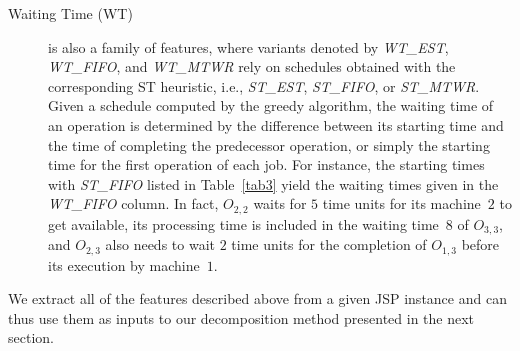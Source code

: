 \documentclass[runningheads]{llncs}
\newcommand{\stest}{\textit{ST\_EST}\xspace}
\newcommand{\stmtwr}{\textit{ST\_MTWR}\xspace}
\newcommand{\stfifo}{\textit{ST\_FIFO}\xspace}
\newcommand{\wtest}{\textit{WT\_EST}\xspace}
\newcommand{\wtmtwr}{\textit{WT\_MTWR}\xspace}
\newcommand{\wtfifo}{\textit{WT\_FIFO}\xspace}
\begin{document}
\begin{description}
  \item[Waiting Time (WT)] is also a family of features, where variants denoted by \wtest, \wtfifo, and \wtmtwr rely on schedules obtained with the corresponding ST heuristic, i.e., \stest, \stfifo, or \stmtwr.
  Given a schedule computed by the greedy algorithm,
  the waiting time of an operation is determined by the difference
  between its starting time and the time of completing the predecessor
  operation, or simply the starting time for the first operation of each job.
  For instance, the starting times with \stfifo listed in Table~\ref{tab3}
  yield the waiting times given in the \wtfifo column.
  In fact, $O_{2,2}$ waits for $5$ time units for its machine~$2$ to get available,
  its processing time is included in the waiting time~$8$ of $O_{3,3}$, and
  $O_{2,3}$ also needs to wait $2$ time units for the completion of $O_{1,3}$
  before its execution by machine~$1$.
\end{description}
%
We extract all of the features described above from a given JSP instance
and can thus use them as inputs to our decomposition method presented in the next section. 
\end{document}
